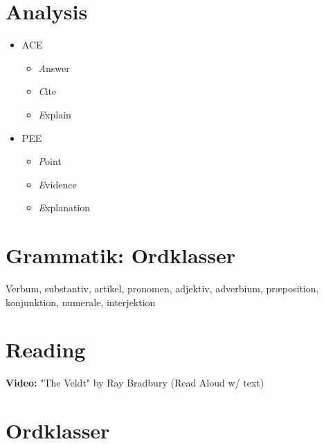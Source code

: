 \documentclass[11pt,a4paper,oneside]{book}
\begin{document}
\section*{Analysis}

\begin{itemize}
\item ACE

\begin{itemize}
\item \emph{A}nswer
\item \emph{C}ite
\item \emph{E}xplain
\end{itemize}

\item PEE

\begin{itemize}
\item \emph{P}oint
\item \emph{E}vidence
\item \emph{E}xplanation
\end{itemize}

\end{itemize}

\section*{Grammatik: Ordklasser}
Verbum, substantiv, artikel, pronomen, adjektiv, adverbium, præposition, konjunktion, numerale, interjektion


\section*{Reading}

\par\noindent\textbf{Video:} "The Veldt" by Ray Bradbury (Read Aloud w/ text)\par\medskip

\section*{Ordklasser}
\end{document}
